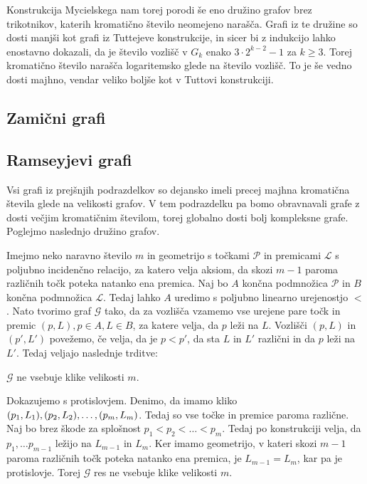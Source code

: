 \documentclass[mat1, tisk]{fmfdelo}
\begin{document}
Konstrukcija Mycielskega nam torej porodi še eno družino grafov brez trikotnikov, katerih kromatično število neomejeno narašča. Grafi iz te družine so dosti manjši kot grafi iz Tuttejeve konstrukcije,
in sicer bi z indukcijo lahko enostavno dokazali, da je število vozlišč v $G_k$ enako $3 \cdot 2^{k-2} - 1$ za $k \geq 3$. Torej kromatično število narašča logaritemsko glede na število vozlišč. To je še vedno dosti
majhno, vendar veliko boljše kot v Tuttovi konstrukciji.

\subsection{Zamični grafi}

\subsection{Ramseyjevi grafi}
Vsi grafi iz prejšnjih podrazdelkov so dejansko imeli precej majhna kromatična števila glede na velikosti grafov. V tem podrazdelku pa bomo obravnavali grafe z dosti večjim kromatičnim številom,
torej globalno dosti bolj kompleksne grafe. Poglejmo naslednjo družino grafov.

Imejmo neko naravno število $m$ in geometrijo s točkami $\mathcal{P}$ in premicami $\mathcal{L}$ s poljubno incidenčno relacijo, za katero velja aksiom, da skozi $m-1$ paroma različnih točk poteka natanko ena premica. Naj bo $A$ končna podmnožica $\mathcal{P}$ in
$B$ končna podmnožica $\mathcal{L}$. Tedaj lahko $A$ uredimo s poljubno linearno urejenostjo $<$. Nato tvorimo graf $\mathcal{G}$ tako, da za vozlišča vzamemo vse urejene pare točk in premic $(p, L), p \in A, L \in B$, za katere velja,
da $p$ leži na $L$. Vozlišči $(p, L)$ in $(p', L')$ povežemo, če velja, da je $p < p'$, da sta $L$ in $L'$ različni in da $p$ leži na $L'$. Tedaj veljajo naslednje trditve:

    \begin{trditev}
        $\mathcal{G}$ ne vsebuje klike velikosti $m$.
    \end{trditev}

    \begin{dokaz}
        Dokazujemo s protislovjem. Denimo, da imamo kliko $(p_1, L_1), (p_2, L_2), \ldots,\\ (p_m, L_m)$. Tedaj so vse točke in premice paroma različne. Naj bo brez škode za splošnost $p_1 < p_2 < \ldots < p_m$. Tedaj po konstrukciji
        velja, da $p_1, \ldots p_{m-1}$ ležijo na $L_{m-1}$ in $L_m$. Ker imamo geometrijo, v kateri skozi $m-1$ paroma različnih točk poteka natanko ena premica, je $L_{m-1} = L_m$, kar pa je protislovje. Torej $\mathcal{G}$ res ne vsebuje klike velikosti $m$.
    \end{dokaz}
\end{document}
